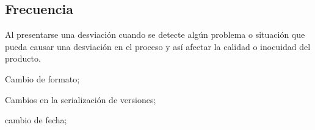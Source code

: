 \subsection{Frecuencia}
Al presentarse una desviación cuando se detecte algún problema o situación que pueda causar una desviación en el proceso y así afectar la calidad o inocuidad del producto.

\begin{changelog}[title=Registro de cambios,simple, sectioncmd=\subsection*,label=changelog-\thesection-\MayorVer.\MenorVer4]
	\begin{version}[v=\MayorVer.\MenorVer, date=2023--01, author=Pablo E. Alanis]
		\item Cambio de formato;
		\item Cambios en la serialización de versiones;
	\end{version}

	\begin{version}[v=1.6, date=2022--05, author=Alonso M.]
		\item cambio de fecha;
	\end{version}

\end{changelog}

